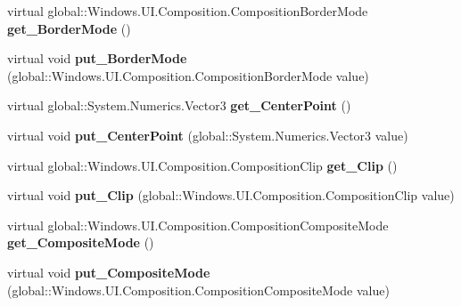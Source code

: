\begin{DoxyCompactItemize}
virtual global\+::\+Windows.\+U\+I.\+Composition.\+Composition\+Border\+Mode {\bfseries get\+\_\+\+Border\+Mode} ()
\item 
\mbox{\label{class_windows_1_1_u_i_1_1_composition_1_1_visual_ad4fd972123d9a322d431e5f8790ba7b9}} 
virtual void {\bfseries put\+\_\+\+Border\+Mode} (global\+::\+Windows.\+U\+I.\+Composition.\+Composition\+Border\+Mode value)
\item 
\mbox{\label{class_windows_1_1_u_i_1_1_composition_1_1_visual_a35059d715a23e7424f1d2560320e1cab}} 
virtual global\+::\+System.\+Numerics.\+Vector3 {\bfseries get\+\_\+\+Center\+Point} ()
\item 
\mbox{\label{class_windows_1_1_u_i_1_1_composition_1_1_visual_abaf21711735234faa45f4f4c7eee581d}} 
virtual void {\bfseries put\+\_\+\+Center\+Point} (global\+::\+System.\+Numerics.\+Vector3 value)
\item 
\mbox{\label{class_windows_1_1_u_i_1_1_composition_1_1_visual_ac3938fd79afc01b7c592141ee4b0cf63}} 
virtual global\+::\+Windows.\+U\+I.\+Composition.\+Composition\+Clip {\bfseries get\+\_\+\+Clip} ()
\item 
\mbox{\label{class_windows_1_1_u_i_1_1_composition_1_1_visual_a1d62ae483edf07661fa132e98c1d1dbf}} 
virtual void {\bfseries put\+\_\+\+Clip} (global\+::\+Windows.\+U\+I.\+Composition.\+Composition\+Clip value)
\item 
\mbox{\label{class_windows_1_1_u_i_1_1_composition_1_1_visual_a51075ac8d9a733304f167464da6c84b8}} 
virtual global\+::\+Windows.\+U\+I.\+Composition.\+Composition\+Composite\+Mode {\bfseries get\+\_\+\+Composite\+Mode} ()
\item 
\mbox{\label{class_windows_1_1_u_i_1_1_composition_1_1_visual_ad6c8a2e02e7ec62e2dd9406efe0e37b1}} 
virtual void {\bfseries put\+\_\+\+Composite\+Mode} (global\+::\+Windows.\+U\+I.\+Composition.\+Composition\+Composite\+Mode value)
\item 

\end{DoxyCompactItemize}
